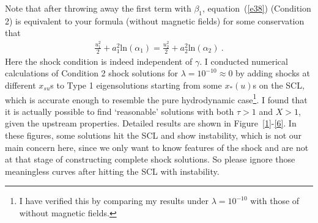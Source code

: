 \documentclass[fleqn,usenatbib]{mnras}
\begin{document}
Note that after throwing away the first term with $\beta_{1}$, equation~(\ref{e38}) (Condition 2) is equivalent to your formula (without magnetic fields) for some conservation that 
\begin{gather}
\frac{u_{1}^{2}}{2}+a_{1}^{2}\mathrm{ln}(\alpha_{1})=\frac{u_{2}^{2}}{2}+a_{2}^{2}\mathrm{ln}(\alpha_{2})\ .\label{e39}
\end{gather}
Here the shock condition is indeed independent of $\gamma$. I conducted numerical calculations of Condition 2 shock solutions for $\lambda=10^{-10}\approx 0$ by adding shocks at different $x_{su}$s to Type 1 eigensolutions starting from some $x_{*}(u)$s on the SCL, which is accurate enough to resemble the pure hydrodynamic case\footnote{I have verified this by comparing my results under $\lambda=10^{-10}$ with those of \citet{lou2014self} without magnetic fields. }. I found that it is actually possible to find `reasonable' solutions with both $\tau>1$ and $X>1$, given the upstream properties. Detailed results are shown in Figure~\ref{1}-\ref{6}. In these figures, some solutions hit the SCL and show instability, which is not our main concern here, since we only want to know features of the shock and are not at that stage of constructing complete shock solutions. So please ignore those meaningless curves after hitting the SCL with instability.
\end{document}
